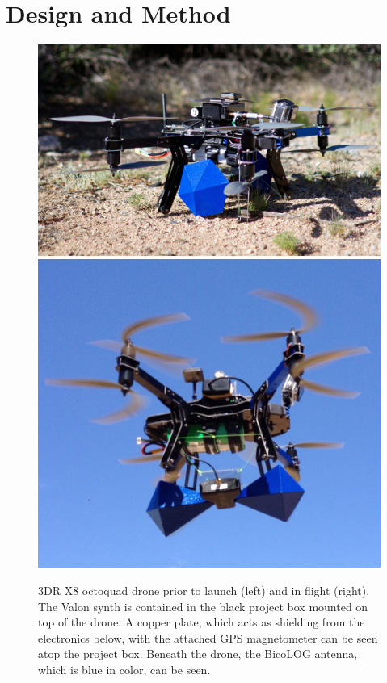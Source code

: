 \documentclass[draft,ras]{AGUJournal}
\begin{document}
\section{Design and Method}


\begin{figure}[h]
\centering
\includegraphics[scale=0.18]{images/drone2.png}
\includegraphics[scale=0.339]{images/drone.png}
\caption{3DR X8 octoquad drone prior to launch (left) and in flight (right).  The Valon synth is contained in the black project box mounted on top of the drone.  A copper plate, which acts as shielding from the electronics below, with the attached GPS magnetometer can be seen atop the project box. Beneath the drone, the BicoLOG antenna, which is blue in color, can be seen.}
\label{fig:drone}
\end{figure}
\end{document}
